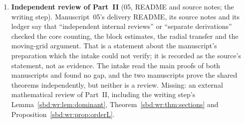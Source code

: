\documentclass[11pt,a4paper]{article}
\theoremstyle{definition}
\begin{document}
\begin{enumerate}[label=\textbf{\arabic*.},leftmargin=*]
\item \textbf{Independent review of Part~II} (05, README and source notes;
the writing step). Manuscript~05's delivery README, its source notes and
its ledger say that ``independent internal reviews'' or ``separate
derivations'' checked the core counting, the block estimates, the radial
transfer and the moving-grid argument. That is a statement about the
manuscript's preparation which the intake could not verify; it is recorded
as the source's statement, not as evidence. The intake read the main proofs
of both manuscripts and found no gap, and the two manuscripts prove the
shared theorems independently, but neither is a review. Missing: an
external mathematical review of Part~II, including the writing step's
Lemma~\ref{sbd:wr:lem:dominant}, Theorem~\ref{sbd:wr:thm:sections} and
Proposition~\ref{sbd:wr:prop:orderL}.


\end{enumerate}
\end{document}
